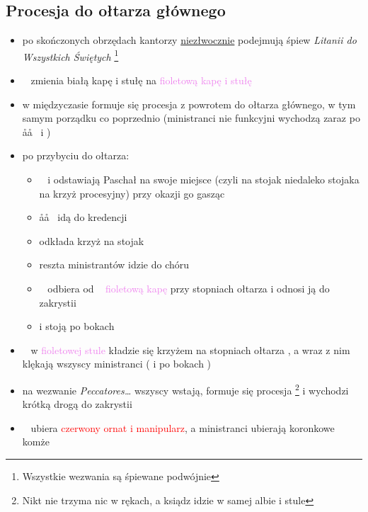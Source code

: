 \subsection{Procesja do ołtarza głównego}
\begin{itemize}
	\item po skończonych obrzędach kantorzy \underline{niezłwocznie} podejmują
	      śpiew \textit{Litanii do Wszystkich Świętych} \footnote{Wszystkie
		      wezwania są śpiewane podwójnie}
	\item \ii~ zmienia \textcolor{black!50}{białą kapę i stułę} na
	      \textcolor{violet}{fioletową kapę i stułę}
	\item w międzyczasie formuje się procesja z powrotem do ołtarza głównego, w
	      tym samym porządku co poprzednio (ministranci nie funkcyjni wychodzą
	      zaraz po \aa\aa~ i )
	\item po przybyciu do ołtarza:
	      \begin{itemize}
		      \item \paschal~ i  odstawiają Paschał na swoje miejsce (czyli
		            na stojak niedaleko stojaka na krzyż procesyjny) przy okazji
		            go gasząc
		      \item \aa\aa~ idą do kredencji
		      \item {} odkłada krzyż na stojak
		      \item reszta ministrantów idzie do chóru
		      \item \zz~ odbiera od \ii~ \textcolor{violet}{fioletową kapę} przy
		            stopniach ołtarza i odnosi ją do zakrystii
		      \item {} i  stoją po bokach \ii
	      \end{itemize}
	\item \ii~ w \textcolor{violet}{fioletowej stule} kładzie się krzyżem na
	      stopniach ołtarza , a wraz z nim klękają wszyscy ministranci ( i 
	      po bokach \ii)
	\item na wezwanie \textit{Peccatores\dots} wszyscy wstają, formuje się
	      procesja \footnote{Nikt nie trzyma nic w rękach, a ksiądz idzie w
		      samej albie i stule} i wychodzi krótką drogą do zakrystii
	\item \ii~ ubiera \textcolor{red}{czerwony ornat i manipularz}, a
	      ministranci ubierają koronkowe komże
\end{itemize}
